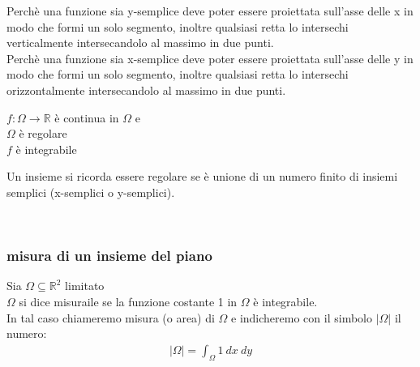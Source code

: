 \documentclass[a4paper, oneside]{article}
\begin{document}
Perchè una funzione sia y-semplice deve poter essere proiettata sull'asse delle x in modo che formi un solo segmento, inoltre qualsiasi retta lo intersechi verticalmente intersecandolo al massimo in due punti.\\
Perchè una funzione sia x-semplice deve poter essere proiettata sull'asse delle y in modo che formi un solo segmento, inoltre qualsiasi retta lo intersechi orizzontalmente intersecandolo al massimo in due punti.\\

\begin{theorem}
     $f:\Omega \to \mathbb{R}$ è continua in $\Omega$ e\\
     $\Omega$ è regolare\\
     $f$ è integrabile
    \begin{center}
    \end{center}
\end{theorem}
\begin{aside}
    Un insieme si ricorda essere regolare se è unione di un numero finito di insiemi semplici (x-semplici o y-semplici).
\end{aside}
\hfill\\


\subsubsection{misura di un insieme del piano}
\begin{definition}
    Sia $\Omega \subseteq \mathbb{R}^2$ limitato\\
    $\Omega$ si dice misuraile se la funzione costante 1 in $\Omega$ è integrabile.\\
    In tal caso chiameremo misura (o area) di $\Omega$ e indicheremo con il simbolo $|\Omega|$ il numero:
    \begin{gather*}
        |\Omega| = \int_{\Omega} 1 \ dx \ dy
    \end{gather*} 
\end{definition}
\end{document}
